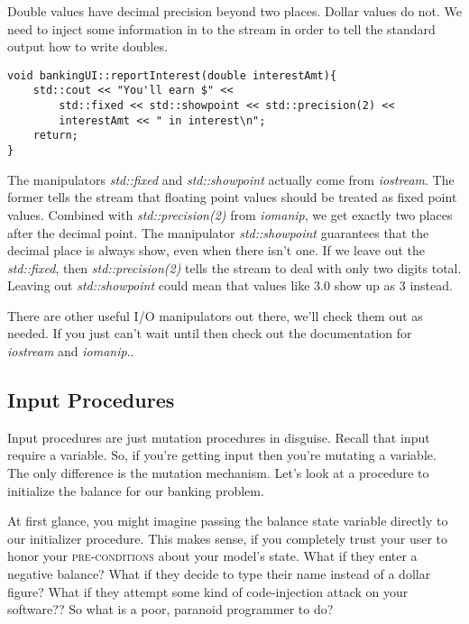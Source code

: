 Double values have decimal precision beyond two places. Dollar values do not. We need to inject some information in to the stream in order to tell the standard output how to write doubles. 
\begin{verbatim}
void bankingUI::reportInterest(double interestAmt){
	std::cout << "You'll earn $" << 
	    std::fixed << std::showpoint << std::precision(2) <<
	    interestAmt << " in interest\n";	
	return; 
}
\end{verbatim}
The manipulators \textit{std::fixed} and \textit{std::showpoint} actually come from \textit{iostream}. The former tells the stream that floating point values should be treated as fixed point values. Combined with \textit{std::precision(2)} from \textit{iomanip}, we get exactly two places after the decimal point. The manipulator \textit{std::showpoint} guarantees that the decimal place is always show, even when there isn't one. If we leave out the \textit{std::fixed}, then \textit{std::precision(2)} tells the stream to deal with only two digits total. Leaving out \textit{std::showpoint} could mean that values like $3.0$ show up as $3$ instead.

There are other useful I/O manipulators out there, we'll check them out as needed. If you just can't wait until then check out the documentation for \textit{iostream} and \textit{iomanip}..

\subsection{Input Procedures}

Input procedures are just mutation procedures in disguise. Recall that input require a variable. So, if you're getting input then you're mutating a variable. The only difference is the mutation mechanism. Let's look at a procedure to initialize the balance for our banking problem. 

At first glance, you might imagine passing the balance state variable directly to our initializer procedure. This makes sense, if you completely trust your user to honor your \textsc{pre-conditions} about your model's state. What if they enter a negative balance? What if they decide to type their name instead of a dollar figure? What if they attempt some kind of code-injection attack on your software??  So what is a poor, paranoid programmer to do?

